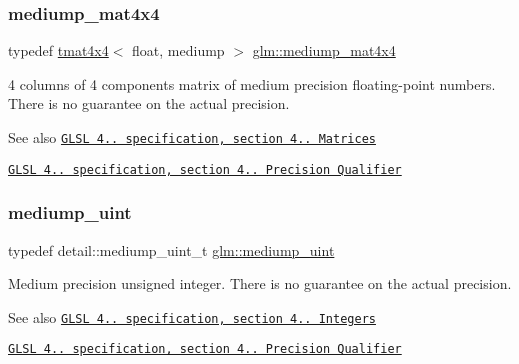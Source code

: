 \subsubsection{\texorpdfstring{mediump\+\_\+mat4x4}{mediump\_mat4x4}}
{\footnotesize\ttfamily typedef \hyperlink{structglm_1_1tmat4x4}{tmat4x4}$<$ float, mediump $>$ \hyperlink{group__core__precision_gaad45864262bb2cf923667fde779a0058}{glm\+::mediump\+\_\+mat4x4}}

4 columns of 4 components matrix of medium precision floating-\/point numbers. There is no guarantee on the actual precision.

\begin{DoxySeeAlso}{See also}
\href{http://www.opengl.org/registry/doc/GLSLangSpec.4.20.8.pdf}{\tt G\+L\+SL 4.. specification, section 4.. Matrices} 

\href{http://www.opengl.org/registry/doc/GLSLangSpec.4.20.8.pdf}{\tt G\+L\+SL 4.. specification, section 4.. Precision Qualifier} 
\end{DoxySeeAlso}
\mbox{\label{group__core__precision_ga08ae38ad78ade3539fdd1d25052b8c51}} 
\subsubsection{\texorpdfstring{mediump\+\_\+uint}{mediump\_uint}}
{\footnotesize\ttfamily typedef detail\+::mediump\+\_\+uint\+\_\+t \hyperlink{group__core__precision_ga08ae38ad78ade3539fdd1d25052b8c51}{glm\+::mediump\+\_\+uint}}

Medium precision unsigned integer. There is no guarantee on the actual precision.

\begin{DoxySeeAlso}{See also}
\href{http://www.opengl.org/registry/doc/GLSLangSpec.4.20.8.pdf}{\tt G\+L\+SL 4.. specification, section 4.. Integers} 

\href{http://www.opengl.org/registry/doc/GLSLangSpec.4.20.8.pdf}{\tt G\+L\+SL 4.. specification, section 4.. Precision Qualifier} 
\end{DoxySeeAlso}
\mbox{\label{group__core__precision_ga7ec96113b08a8435fd80dd623ffe3e05}} 

